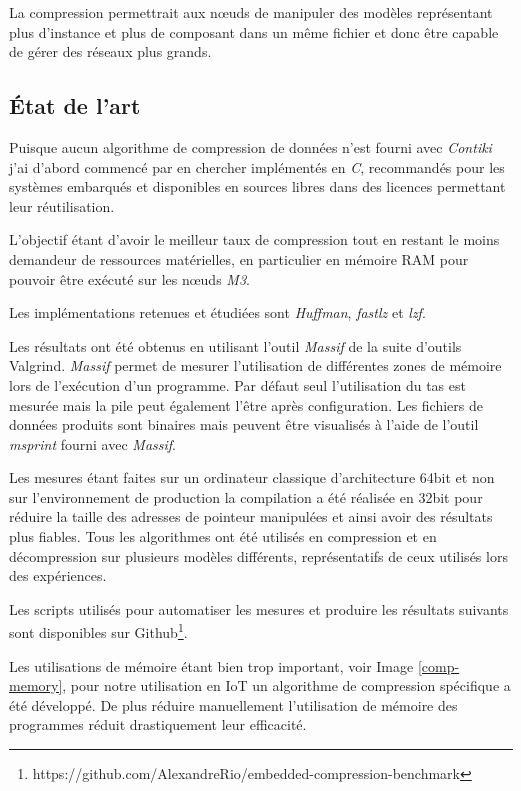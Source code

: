 La compression permettrait aux nœuds de manipuler des modèles représentant plus d'instance et plus de composant dans un même fichier et donc être capable de gérer des réseaux plus grands.

\subsection{État de l'art}

Puisque aucun algorithme de compression de données n'est fourni avec \emph{Contiki} j'ai d'abord commencé par en chercher implémentés en \emph{C}, recommandés pour les systèmes embarqués et disponibles en sources libres dans des licences permettant leur réutilisation.

L'objectif étant d'avoir le meilleur taux de compression tout en restant le moins demandeur de ressources matérielles, en particulier en mémoire RAM pour pouvoir être exécuté sur les nœuds \emph{M3}.

Les implémentations retenues et étudiées sont \emph{Huffman}, \emph{fastlz}\cite{fastlz} et \emph{lzf}\cite{liblzf}.

Les résultats ont été obtenus en utilisant l'outil \emph{Massif}\cite{massif} de la suite d'outils Valgrind. \emph{Massif} permet de mesurer l'utilisation de différentes zones de mémoire lors de l'exécution d'un programme. Par défaut seul l'utilisation du tas est mesurée mais la pile peut également l'être après configuration. Les fichiers de données produits sont binaires mais peuvent être visualisés à l'aide de l'outil \emph{msprint} fourni avec \emph{Massif}.

Les mesures étant faites sur un ordinateur classique d'architecture 64bit et non sur l'environnement de production la compilation a été réalisée en 32bit pour réduire la taille des adresses de pointeur manipulées et ainsi avoir des résultats plus fiables. Tous les algorithmes ont été utilisés en compression et en décompression sur plusieurs modèles différents, représentatifs de ceux utilisés lors des expériences.

Les scripts utilisés pour automatiser les mesures et produire les résultats suivants sont disponibles sur Github\footnote{https://github.com/AlexandreRio/embedded-compression-benchmark}.

Les utilisations de mémoire étant bien trop important, voir Image \ref{comp-memory}, pour notre utilisation en IoT un algorithme de compression spécifique a été développé. De plus réduire manuellement l'utilisation de mémoire des programmes réduit drastiquement leur efficacité.

